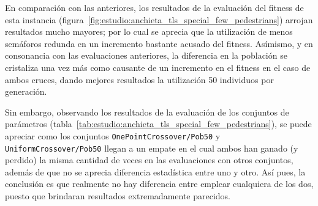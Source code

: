 En comparación con las anteriores, los resultados de la evaluación del fitness de esta instancia (figura~\ref{fig:estudio:anchieta_tls_special_few_pedestrians}) arrojan resultados mucho mayores; por lo cual se aprecia que la utilización de menos semáforos redunda en un incremento bastante acusado del fitness. Asímismo, y en consonancia con las evaluaciones anteriores, la diferencia en la población se cristaliza una vez más como causante de un incremento en el fitness en el caso de ambos cruces, dando mejores resultados la utilización 50 individuos por generación.

Sin embargo, observando los resultados de la evaluación de los conjuntos de parámetros (tabla~\ref{tab:estudio:anchieta_tls_special_few_pedestrians}), se puede apreciar como los conjuntos \texttt{OnePointCrossover/Pob50} y \texttt{UniformCrossover/Pob50} llegan a un empate en el cual ambos han ganado (y perdido) la misma cantidad de veces en las evaluaciones con otros conjuntos, además de que no se aprecia diferencia estadística entre uno y otro. Así pues, la conclusión es que realmente no hay diferencia entre emplear cualquiera de los dos, puesto que brindaran resultados extremadamente parecidos.

